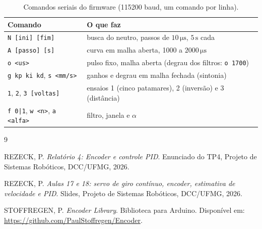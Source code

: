 \documentclass[11pt,a4paper]{article}
\newcommand{\unid}[1]{\,\mathrm{#1}}
\begin{document}
\begin{table}[htbp]
\centering
\caption{Comandos seriais do firmware (115200 baud, um comando por linha).}
\label{tab:cmd}
\begin{tabular}{ll}
\toprule
Comando & O que faz \\
\midrule
\texttt{N [ini] [fim]} & busca do neutro, passos de $10\unid{\mu s}$, $5\unid{s}$ cada \\
\texttt{A [passo] [s]} & curva em malha aberta, 1000 a $2000\unid{\mu s}$ \\
\texttt{o <us>} & pulso fixo, malha aberta (degrau dos filtros: \texttt{o 1700}) \\
\texttt{g kp ki kd}, \texttt{s <mm/s>} & ganhos e degrau em malha fechada (sintonia) \\
\texttt{1}, \texttt{2}, \texttt{3 [voltas]} & ensaios 1 (cinco patamares), 2 (inversão) e 3 (distância) \\
\texttt{f 0|1}, \texttt{w <n>}, \texttt{a <alfa>} & filtro, janela e $\alpha$ \\
\bottomrule
\end{tabular}
\end{table}

\begin{thebibliography}{9}

REZECK, P. \textit{Relatório 4: Encoder e controle PID}. Enunciado do TP4, Projeto de Sistemas Robóticos, DCC/UFMG, 2026.

REZECK, P. \textit{Aulas 17 e 18: servo de giro contínuo, encoder, estimativa de velocidade e PID}. Slides, Projeto de Sistemas Robóticos, DCC/UFMG, 2026.

STOFFREGEN, P. \textit{Encoder Library}. Biblioteca para Arduino. Disponível em: \url{https://github.com/PaulStoffregen/Encoder}.

\end{thebibliography}
\end{document}
